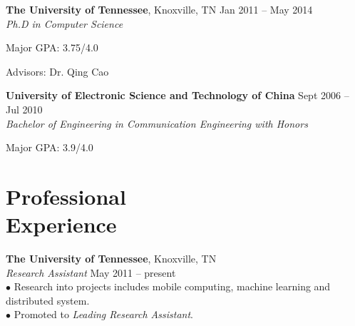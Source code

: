 \documentclass[margin, centered]{resume}
\begin{document}
\begin{resume}
    \textbf{The University of Tennessee}, Knoxville, TN \hfill Jan 2011 -- May 2014\vspace{0mm}\\\vspace{0mm}%
    \emph{Ph.D in Computer Science} \vspace{-1mm}\\\vspace{-2mm}%
    \begin{list2}
        \item Major GPA: 3.75/4.0
        \item Advisors:  Dr. Qing Cao
    \end{list2}\vspace{-1mm}
    \textbf{University of Electronic Science and Technology of China} \hfill Sept 2006 -- Jul 2010\vspace{0mm}\\\vspace{0mm}%
	\emph{Bachelor of Engineering in Communication Engineering with Honors} \vspace{-1mm}\\\vspace{-2mm}%
	\begin{list2}
		\item Major GPA: 3.9/4.0
	\end{list2}\vspace{1mm} 

    \section{\mysidestyle Professional\\Experience}

    \textbf{The University of Tennessee}, Knoxville, TN \\\vspace{0mm}%
    \emph{Research Assistant} \hfill May 2011 -- present\vspace{0mm}\\
    $\bullet$ Research into projects includes mobile computing, machine learning and distributed system.\vspace{0mm}\\
    $\bullet$ Promoted to \textsl{Leading Research Assistant}.\vspace{-5mm}\\


\end{resume}
\end{document}
